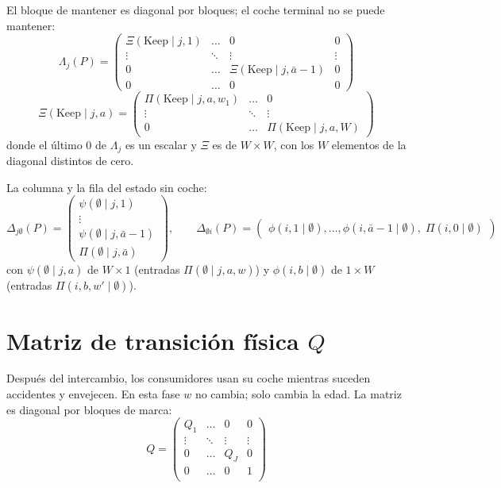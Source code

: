 \documentclass{article}
\begin{document}
El bloque de mantener es diagonal por bloques; el coche terminal no se puede mantener:
$$
\Lambda_j(P)=
\begin{pmatrix}
    \Xi(\text{Keep}\mid j, 1) & \dots & 0 & 0\\
    \vdots & \ddots & \vdots & \vdots\\
    0 & \dots & \Xi(\text{Keep}\mid j, \bar{a}-1) & 0\\
    0 & \dots & 0 & 0
\end{pmatrix}
$$
$$
\Xi(\text{Keep}\mid j, a) =
\begin{pmatrix}
    \Pi(\text{Keep} \mid j, a, w_1) & \dots & 0\\
    \vdots & \ddots & \vdots \\
    0 & \dots & \Pi(\text{Keep} \mid j, a, W)
\end{pmatrix}
$$
donde el último $0$ de $\Lambda_j$ es un escalar y $\Xi$ es de $W\times W$, con los $W$ elementos de la diagonal distintos de cero.

La columna y la fila del estado sin coche:
$$
\Delta_{j \emptyset}(P)=\begin{pmatrix}
    \psi(\emptyset \mid j, 1)\\
    \vdots \\
    \psi(\emptyset \mid j, \bar{a}-1)\\
    \Pi(\emptyset \mid j, \bar{a})
\end{pmatrix},
\qquad
\Delta_{\emptyset i}(P)=\begin{pmatrix}
    \phi(i, 1 \mid \emptyset), \dots, \phi(i, \bar{a}-1 \mid \emptyset),\; \Pi(i, 0 \mid \emptyset)
\end{pmatrix}
$$
con $\psi(\emptyset\mid j,a)$ de $W\times1$ (entradas $\Pi(\emptyset\mid j,a,w)$) y $\phi(i,b\mid\emptyset)$ de $1\times W$ (entradas $\Pi(i,b,w'\mid\emptyset)$).

\section*{Matriz de transición física $Q$}

Después del intercambio, los consumidores usan su coche mientras suceden accidentes y envejecen. En esta fase $w$ no cambia; solo cambia la edad. La matriz es diagonal por bloques de marca:
$$Q=
\begin{pmatrix}
    Q_1 & \dots & 0 & 0 \\
    \vdots & \ddots& \vdots & \vdots \\
    0 & \dots & Q_J & 0 \\
    0 & \dots & 0 & 1 \\
\end{pmatrix}
$$
\end{document}
